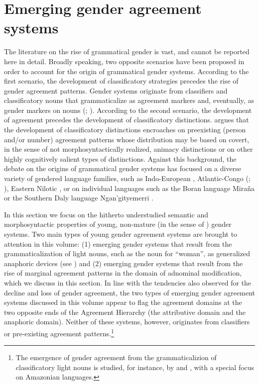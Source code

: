 \documentclass[output=collectionpaper]{langsci/langscibook}
\begin{document}
\section{Emerging gender agreement systems}
\label{subsec:emerging}
The literature on the rise of grammatical gender is vast, and cannot be reported here in detail. Broadly speaking, two opposite scenarios have been proposed in order to account for the origin of grammatical gender systems. According to the first scenario, the development of classificatory strategies precedes the rise of gender agreement patterns. Gender systems originate from classifiers and classificatory nouns that grammaticalize as agreement markers and, eventually, as gender markers on nouns (\citealt{Greenberg1978}; \citealt{Corbett1991}).
According to the second scenario, the development of agreement precedes the development of classificatory distinctions.  \citet[139--142]{Nichols1992} argues that the development of classificatory distinctions encroaches on preexisting (person and/or number) agreement patterns whose distribution may be based on covert, in the sense of not morphosyntactically realized, animacy distinctions or on other highly cognitively salient types of distinctions.
Against this background, the debate on the origins of grammatical gender systems has focused on a diverse variety of gendered language families, such as Indo-European \citep{Matasovic2004,Luraghi2011}, Atlantic-Congo (\citealt{Greenberg1978}; \citealt{Williamson1994}), Eastern Nilotic \citep{Heine1983}, or on individual languages such as the Boran language Mira\~{n}a \citep{Seifart2005} or the Southern Daly language Ngan'gityemerri \citep{Reid1997}.

In this section we focus on the hitherto understudied semantic and morphosyntactic properties of young, non-mature (in the sense of \citealt{Dahl2004}) gender systems. Two main types of young gender agreement systems are brought to attention in this volume: (1) emerging gender systems that result from the grammaticalization of light nouns, such as the noun for ``woman'', as generalized anaphoric devices (see ) and (2) emerging gender systems that result from the rise of marginal agreement patterns in the domain of adnominal modification, which we discuss in this section. In line with the tendencies also observed for the decline and loss of gender agreement, the two types of emerging gender agreement systems discussed in this volume appear to flag the agreement domains at the two opposite ends of the Agreement Hierarchy (the attributive domain and the anaphoric domain). Neither of these systems, however, originates from classifiers or pre-existing agreement patterns.\footnote{The emergence of gender agreement from the grammaticalizion of classificatory light nouns is studied, for instance, by \citet{Grinevald2004} and \cite{Seifart2005}, with a special focus on Amazonian languages.}
\end{document}
